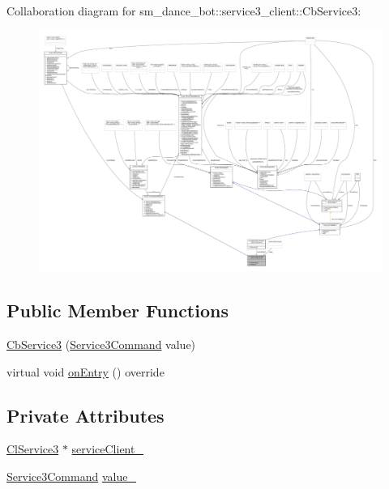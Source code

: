 Collaboration diagram for sm\+\_\+dance\+\_\+bot\+:\+:service3\+\_\+client\+:\+:Cb\+Service3\+:
\nopagebreak
\begin{figure}[H]
\begin{center}
\leavevmode
\includegraphics[width=350pt]{classsm__dance__bot_1_1service3__client_1_1CbService3__coll__graph}
\end{center}
\end{figure}
\subsection*{Public Member Functions}
\begin{DoxyCompactItemize}
\item 
\hyperlink{classsm__dance__bot_1_1service3__client_1_1CbService3_ad982518a7b34400eacc91587a20f27fe}{Cb\+Service3} (\hyperlink{namespacesm__dance__bot_1_1service3__client_a0c026b8bb6e886927f5f5b1750d90e63}{Service3\+Command} value)
\item 
virtual void \hyperlink{classsm__dance__bot_1_1service3__client_1_1CbService3_a900d971d6955e6d296a8e082435ace67}{on\+Entry} () override
\end{DoxyCompactItemize}
\subsection*{Private Attributes}
\begin{DoxyCompactItemize}
\item 
\hyperlink{classsm__dance__bot_1_1service3__client_1_1ClService3}{Cl\+Service3} $\ast$ \hyperlink{classsm__dance__bot_1_1service3__client_1_1CbService3_af0d87e9fa611b477f2504884b432b218}{service\+Client\+\_\+}
\item 
\hyperlink{namespacesm__dance__bot_1_1service3__client_a0c026b8bb6e886927f5f5b1750d90e63}{Service3\+Command} \hyperlink{classsm__dance__bot_1_1service3__client_1_1CbService3_aaa2ff5b19ca8f09bdcd903df4cdd427a}{value\+\_\+}
\end{DoxyCompactItemize}
